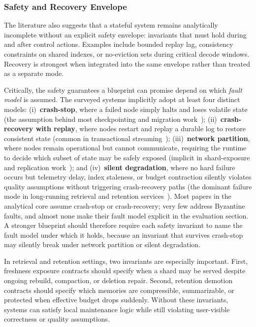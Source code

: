 \documentclass[acmsmall,screen,review]{acmart}
\begin{document}
\subsubsection{Safety and Recovery Envelope}

The literature also suggests that a stateful system remains analytically incomplete without an explicit safety envelope: invariants that must hold during and after control actions. Examples include bounded replay lag, consistency constraints on shared indexes, or no-eviction sets during critical decode windows. Recovery is strongest when integrated into the same envelope rather than treated as a separate mode.

Critically, the safety guarantees a blueprint can promise depend on which \emph{fault model} is assumed. The surveyed systems implicitly adopt at least four distinct models: (i)~\textbf{crash-stop}, where a failed node simply halts and loses volatile state (the assumption behind most checkpointing and migration work~\cite{carbone2015asynchronous,chandy1985snapshot}); (ii)~\textbf{crash-recovery with replay}, where nodes restart and replay a durable log to restore consistent state (common in transactional streaming~\cite{mao2023morphstream,zhao2024recovery}); (iii)~\textbf{network partition}, where nodes remain operational but cannot communicate, requiring the runtime to decide which subset of state may be safely exposed (implicit in shard-exposure and replication work~\cite{corbett2012spanner,ongaro2014raft}); and (iv)~\textbf{silent degradation}, where no hard failure occurs but telemetry delay, index staleness, or budget contraction silently violates quality assumptions without triggering crash-recovery paths (the dominant failure mode in long-running retrieval and retention services~\cite{wang2026candor,zhang2026flowrag}). Most papers in the analytical core assume crash-stop or crash-recovery; very few address Byzantine faults, and almost none make their fault model explicit in the evaluation section. A stronger blueprint should therefore require each safety invariant to name the fault model under which it holds, because an invariant that survives crash-stop may silently break under network partition or silent degradation.

In retrieval and retention settings, two invariants are especially important. First, freshness exposure contracts should specify when a shard may be served despite ongoing rebuild, compaction, or deletion repair. Second, retention demotion contracts should specify which memories are compressible, summarizable, or protected when effective budget drops suddenly. Without these invariants, systems can satisfy local maintenance logic while still violating user-visible correctness or quality assumptions.
\end{document}

